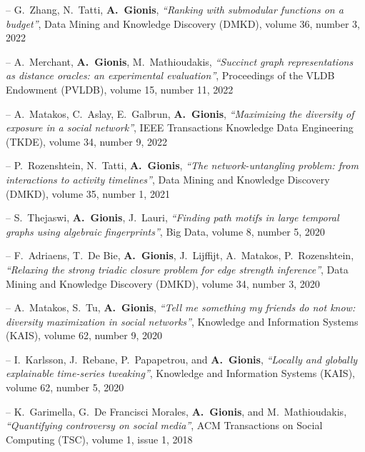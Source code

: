 \documentclass[a4paper,11pt]{article}
\begin{document}
\item[--] 
{G.\ Zhang, N.\ Tatti, \textbf{A.\ Gionis}},
{\em ``Ranking with submodular functions on a budget''},
Data Mining and Knowledge Discovery (DMKD),
volume 36, number 3, 2022

\item[--] 
{A.\ Merchant, \textbf{A.\ Gionis}, M.\ Mathioudakis},
{\em ``Succinct graph representations as distance oracles: an experimental evaluation''},
Proceedings of the VLDB Endowment (PVLDB),
volume 15, number 11, 2022

\item[--] 
{A.\ Matakos, C.\ Aslay, E.\ Galbrun, \textbf{A.\ Gionis}},
{\em ``Maximizing the diversity of exposure in a social network''},
IEEE Transactions Knowledge Data Engineering (TKDE),
volume 34, number 9, 2022

\item[--] 
{P.\ Rozenshtein, N.\ Tatti, \textbf{A.\ Gionis}},
{\em ``The network-untangling problem: from interactions to activity timelines''},
Data Mining and Knowledge Discovery (DMKD),
volume 35, number 1, 2021

\item[--] 
{S.\ Thejaswi, \textbf{A.\ Gionis}, J.\ Lauri},
{\em ``Finding path motifs in large temporal graphs using algebraic fingerprints''},
Big Data, volume 8, number 5, 2020

\item[--] 
{F.\ Adriaens, T.\ De Bie, \textbf{A.\ Gionis}, J.\ Lijffijt, A.\ Matakos, P.\ Rozenshtein},
{\em ``Relaxing the strong triadic closure problem for edge strength inference''},
Data Mining and Knowledge Discovery (DMKD),
volume 34, number 3, 2020

\item[--] 
{A.\ Matakos, S.\ Tu, \textbf{A.\ Gionis}},
{\em ``Tell me something my friends do not know: diversity maximization in social networks''}, 
Knowledge and Information Systems (KAIS),
volume 62, number 9, 2020

\item[--] 
{I.\ Karlsson, J.\ Rebane, P.\ Papapetrou, and \textbf{A.\ Gionis}}, 
{\em ``Locally and globally explainable time-series tweaking''}, 
Knowledge and Information Systems (KAIS),
volume 62, number 5, 2020

\item[--]
{K.\ Garimella, G.\ De Francisci Morales, \textbf{A.\ Gionis}, and M.\ Mathioudakis}, 
{\em ``Quantifying controversy on social media''},
ACM Transactions on Social Computing (TSC),
volume 1, issue 1, 2018
\end{document}
